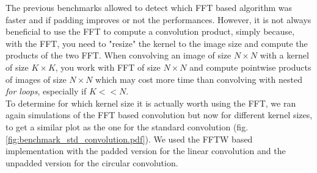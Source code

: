 \documentclass[a4paper,10pt,twoside]{article}
\begin{document}
The previous benchmarks allowed to detect which FFT based algorithm was faster and if padding improves or not the performances. However, it is not always beneficial to use the FFT to compute a convolution product, simply because, with the FFT, you need to "resize" the kernel to the image size and compute the products of the two FFT. When convolving an image of size $N \times N$ with a kernel of size $K \times K$, you work with FFT of size $N \times N$ and compute pointwise products of images of size $N \times N$ which may cost more time than convolving with nested \emph{for loops}, especially if $K << N$.\\

To determine for which kernel size it is actually worth using the FFT, we ran again simulations of the FFT based convolution but now for different kernel sizes, to get a similar plot as the one for the standard convolution (fig. \ref{fig:benchmark_std_convolution.pdf}). We used the FFTW based implementation with the padded version for the linear convolution and the unpadded version for the circular convolution.


%
\end{document}
